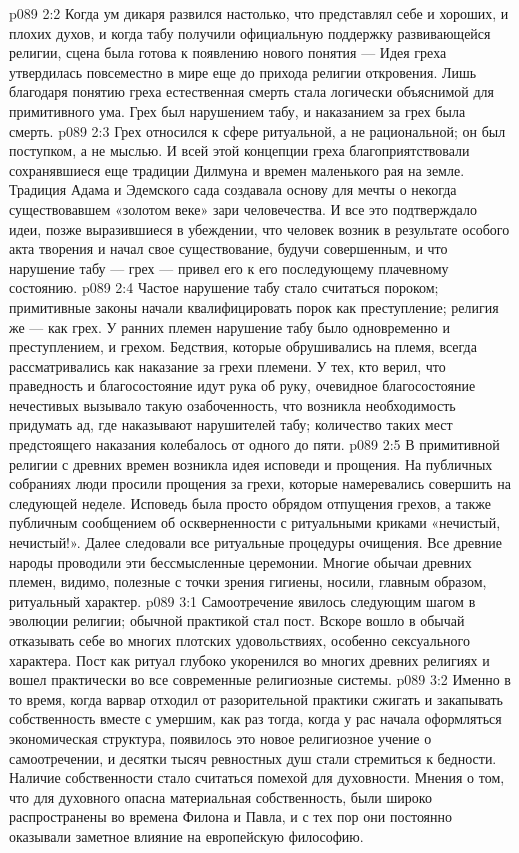 \vs p089 2:2 Когда ум дикаря развился настолько, что представлял себе и хороших, и плохих духов, и когда табу получили официальную поддержку развивающейся религии, сцена была готова к появлению нового понятия ---  Идея греха утвердилась повсеместно в мире еще до прихода религии откровения. Лишь благодаря понятию греха естественная смерть стала логически объяснимой для примитивного ума. Грех был нарушением табу, и наказанием за грех была смерть.
\vs p089 2:3 Грех относился к сфере ритуальной, а не рациональной; он был поступком, а не мыслью. И всей этой концепции греха благоприятствовали сохранявшиеся еще традиции Дилмуна и времен маленького рая на земле. Традиция Адама и Эдемского сада создавала основу для мечты о некогда существовавшем «золотом веке» зари человечества. И все это подтверждало идеи, позже выразившиеся в убеждении, что человек возник в результате особого акта творения и начал свое существование, будучи совершенным, и что нарушение табу --- грех --- привел его к его последующему плачевному состоянию.
\vs p089 2:4 Частое нарушение табу стало считаться пороком; примитивные законы начали квалифицировать порок как преступление; религия же --- как грех. У ранних племен нарушение табу было одновременно и преступлением, и грехом. Бедствия, которые обрушивались на племя, всегда рассматривались как наказание за грехи племени. У тех, кто верил, что праведность и благосостояние идут рука об руку, очевидное благосостояние нечестивых вызывало такую озабоченность, что возникла необходимость придумать ад, где наказывают нарушителей табу; количество таких мест предстоящего наказания колебалось от одного до пяти.
\vs p089 2:5 В примитивной религии с древних времен возникла идея исповеди и прощения. На публичных собраниях люди просили прощения за грехи, которые намеревались совершить на следующей неделе. Исповедь была просто обрядом отпущения грехов, а также публичным сообщением об оскверненности с ритуальными криками «нечистый, нечистый!». Далее следовали все ритуальные процедуры очищения. Все древние народы проводили эти бессмысленные церемонии. Многие обычаи древних племен, видимо, полезные с точки зрения гигиены, носили, главным образом, ритуальный характер.
\vs p089 3:1 Самоотречение явилось следующим шагом в эволюции религии; обычной практикой стал пост. Вскоре вошло в обычай отказывать себе во многих плотских удовольствиях, особенно сексуального характера. Пост как ритуал глубоко укоренился во многих древних религиях и вошел практически во все современные религиозные системы.
\vs p089 3:2 Именно в то время, когда варвар отходил от разорительной практики сжигать и закапывать собственность вместе с умершим, как раз тогда, когда у рас начала оформляться экономическая структура, появилось это новое религиозное учение о самоотречении, и десятки тысяч ревностных душ стали стремиться к бедности. Наличие собственности стало считаться помехой для духовности. Мнения о том, что для духовного опасна материальная собственность, были широко распространены во времена Филона и Павла, и с тех пор они постоянно оказывали заметное влияние на европейскую философию.
